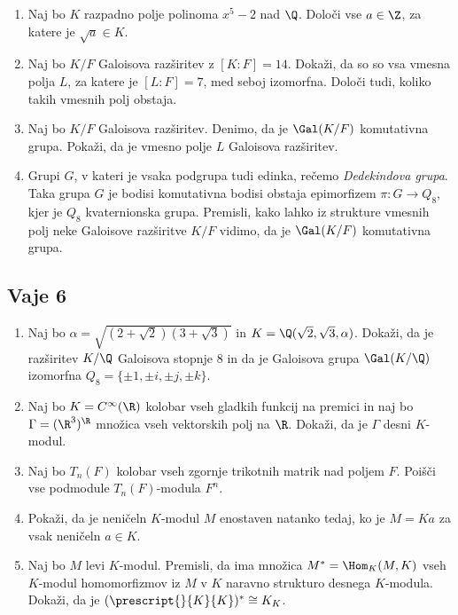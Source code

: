 \begin{enumerate}
    \item Naj bo $K$ razpadno polje polinoma $x^5 - 2$ nad $\Q$. Določi vse $a \in \Z$, za katere je $\sqrt{a} \in K$.
    \item Naj bo $K/F$ Galoisova razširitev z $[K:F] = 14$. Dokaži, da so so vsa vmesna polja $L$, za katere je 
    $[L:F] = 7$, med seboj izomorfna. Določi tudi, koliko takih vmesnih polj obstaja.
    \item Naj bo $K/F$ Galoisova razširitev. Denimo, da je $\Gal(K/F)$ komutativna grupa. Pokaži, da je 
    vmesno polje $L$ Galoisova razširitev.
    \item Grupi $G$, v kateri je vsaka podgrupa tudi edinka, rečemo \emph{Dedekindova grupa}.
    Taka grupa $G$ je bodisi komutativna bodisi obstaja epimorfizem $\pi \colon G \to Q_8$, kjer je $Q_8$ 
    kvaternionska grupa. Premisli, kako lahko iz strukture vmesnih polj neke Galoisove razširitve $K/F$ vidimo, 
    da je $\Gal(K/F)$ komutativna grupa.
\end{enumerate}

\subsection*{Vaje 6}

\begin{enumerate}
    \item Naj bo $\alpha = \sqrt{(2 + \sqrt{2})(3 + \sqrt{3})}$ in $K = \Q(\sqrt{2}, \sqrt{3}, \alpha)$. 
    Dokaži, da je razširitev $K/\Q$ Galoisova stopnje $8$ in da je Galoisova grupa $\Gal(K/\Q)$ 
    izomorfna $Q_8 = \{ \pm 1, \pm i, \pm j, \pm k \}$.
    \item Naj bo $K = C^{\infty}(\R)$ kolobar vseh gladkih funkcij na premici in naj bo 
    $\Gamma = (\R^3)^{\R}$ množica vseh vektorskih polj na $\R$. 
    Dokaži, da je $\Gamma$ desni $K$-modul.
    \item Naj bo $T_n(F)$ kolobar vseh zgornje trikotnih matrik nad poljem $F$. 
    Poišči vse podmodule $T_n(F)$-modula $F^n$.
    \item Pokaži, da je neničeln $K$-modul $M$ enostaven natanko tedaj, ko je $M = K a$ za vsak neničeln $a \in K$.
    \item Naj bo $M$ levi $K$-modul. Premisli, da ima množica $M^* = \Hom_K(M, K)$ 
    vseh $K$-modul homomorfizmov iz $M$ v $K$ naravno strukturo desnega $K$-modula. 
    Dokaži, da je $(\prescript{}{K}{K})^* \cong K_K$.
\end{enumerate}

